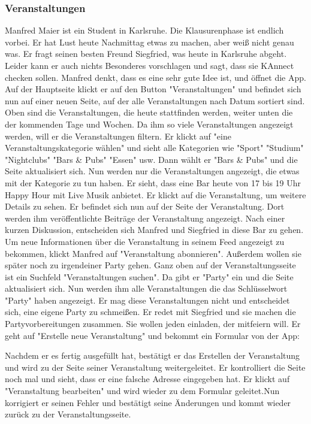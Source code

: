 \documentclass[parskip=full]{scrartcl}
\begin{document}
		\subsubsection{Veranstaltungen}
		Manfred Maier ist ein Student in Karlsruhe. Die Klausurenphase ist endlich vorbei. Er hat Lust heute Nachmittag etwas zu machen, aber weiß nicht genau was. Er fragt seinen besten Freund Siegfried, was heute in Karlsruhe abgeht. Leider kann er auch nichts Besonderes vorschlagen und sagt, dass sie KAnnect checken sollen. Manfred denkt, dass es eine sehr gute Idee ist, und öffnet die App.
		Auf der Hauptseite klickt er auf den Button "Veranstaltungen" und befindet sich nun auf einer neuen Seite, auf der alle Veranstaltungen nach Datum sortiert sind. Oben sind die Veranstaltungen, die heute stattfinden werden, weiter unten die der kommenden Tage und Wochen.
		Da ihm so viele Veranstaltungen angezeigt werden, will er die Veranstaltungen filtern. Er klickt auf "eine Veranstaltungskategorie wählen" und sieht alle Kategorien wie "Sport" "Studium" "Nightclubs" "Bars \& Pubs" "Essen" usw. 
		Dann wählt er "Bars \& Pubs" und die Seite aktualisiert sich. Nun werden nur die Veranstaltungen angezeigt, die etwas mit der Kategorie zu tun haben.
		Er sieht, dass eine Bar heute von 17 bis 19 Uhr Happy Hour mit Live Musik anbietet. Er klickt auf die Veranstaltung, um weitere Details zu sehen. Er befindet sich nun auf der Seite der Veranstaltung. Dort werden ihm veröffentlichte Beiträge der Veranstaltung angezeigt. Nach einer kurzen Diskussion, entscheiden sich Manfred und Siegfried in diese Bar zu gehen. Um neue Informationen über die Veranstaltung in seinem \gls{Feed} angezeigt zu bekommen, klickt Manfred auf "Veranstaltung abonnieren". Außerdem wollen sie später noch zu irgendeiner Party gehen. Ganz oben auf der Veranstaltungsseite ist ein Suchfeld "Veranstaltungen suchen". Da gibt er "Party" ein und die Seite aktualisiert sich. Nun werden ihm alle Veranstaltungen die das Schlüsselwort "Party" haben angezeigt. Er mag diese Veranstaltungen nicht und entscheidet sich, eine eigene Party zu schmeißen. Er redet mit Siegfried und sie machen die Partyvorbereitungen zusammen. Sie wollen jeden einladen, der mitfeiern will. Er geht auf "Erstelle neue Veranstaltung" und bekommt ein Formular von der App: 
		
		
		Nachdem er es fertig ausgefüllt hat, bestätigt er das Erstellen der Veranstaltung und wird zu der Seite seiner Veranstaltung weitergeleitet. Er kontrolliert die Seite noch mal und sieht, dass er eine falsche Adresse eingegeben hat. Er klickt auf "Veranstaltung bearbeiten" und wird wieder zu dem Formular geleitet.Nun korrigiert er seinen Fehler und bestätigt seine Änderungen und kommt wieder zurück zu der Veranstaltungsseite.
		
\end{document}
